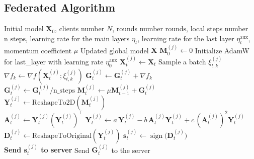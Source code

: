\documentclass{article}
\begin{document}
\subsection{Federated Algorithm}\label{app:fed_alg}
\begin{algorithm}[H]
\caption{Federated SignMuon}
\begin{algorithmic}[1]
\Require Initial model $\mathbf{X}_0$, clients number $N$, rounds number $\mathrm{rounds}$, local steps number $\mathrm{n\_steps}$, learning rate for the main layers $\eta_t$, learning rate for the last layer $\eta_t^{\text{aux}}$,  momentum coefficient $\mu$
\Ensure Updated global model $\mathbf{X}$
 \State $\mathbf{M}_0^{(j)} \gets 0$ 
\EndFor
\State Initialize AdamW for last\_layer with learning rate $\eta^{\mathrm{aux}}_0$
        \State $\mathbf{X}_t^{(j)} \gets \mathbf{X}_t$ 
            \State Sample a batch $\xi_{t,k}^{(j)}$
            \State $\nabla f_k \gets \nabla f(\mathbf{X}_t^{(j)}; \xi_{t,k}^{(j)})$
            \State $\mathbf{G}_t^{(j)} \gets \mathbf{G}_t^{(j)} + \nabla f_k$
        \EndFor
        \\ \State $\mathbf{G}_t^{(j)} \gets \mathbf{G}_t^{(j)} / \mathrm{n\_steps}$ 
        \State $\mathbf{M}_t^{(j)} \gets \mu \mathbf{M}_{t-1}^{(j)} + \mathbf{G}_t^{(j)}$ 
        \State $\mathbf{Y}_t^{(j)} \gets \text{ReshapeTo2D}(\mathbf{M}_t^{(j)})$ 
        \\ 
            \State $\mathbf{A}_t^{(j)} \gets \mathbf{Y}_t^{(j)} (\mathbf{Y}_t^{(j)})^\top$
            \State $\mathbf{Y}_t^{(j)} \gets a\,\mathbf{Y}_t^{(j)} - b\,\mathbf{A}_t^{(j)}\mathbf{Y}_t^{(j)} + c\,(\mathbf{A}_t^{(j)})^2\mathbf{Y}_t^{(j)}$
        \EndFor
        \\\State $\mathbf{D}_t^{(j)} \gets \text{ReshapeToOriginal}(\mathbf{Y}_t^{(j)})$ 
        \State $\mathbf{s}_t^{(j)} \gets \operatorname{sign}\bigl(\mathbf{D}_t^{(j)}\bigr)$ 
        \\\State \textbf{Send $\mathbf{s}_t^{(j)}$ to server} 
          \State Send $\mathbf{G}_t^{(j)}$ to the server 

\end{algorithmic}
\end{algorithm}
\end{document}
